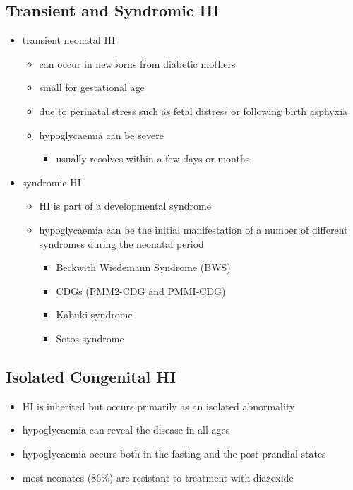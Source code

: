 \documentclass{scrartcl}
\begin{document}
\subsection{Transient and Syndromic HI}
\label{sec:org4ce6423}
\begin{itemize}
\item transient neonatal HI
\begin{itemize}
\item can occur in newborns from diabetic mothers
\item small for gestational age
\item due to perinatal stress such as fetal distress or following birth asphyxia
\item hypoglycaemia can be severe
\begin{itemize}
\item usually resolves within a few days or months
\end{itemize}
\end{itemize}
\item syndromic HI
\begin{itemize}
\item HI is part of a developmental syndrome
\item hypoglycaemia can be the initial manifestation of a number of
different syndromes during the neonatal period
\begin{itemize}
\item Beckwith Wiedemann Syndrome (BWS)
\item CDGs (PMM2-CDG and PMMI-CDG)
\item Kabuki syndrome
\item Sotos syndrome
\end{itemize}
\end{itemize}
\end{itemize}

\subsection{Isolated Congenital HI}
\label{sec:org18daacf}
\begin{itemize}
\item HI is inherited but occurs primarily as an isolated abnormality
\item hypoglycaemia can reveal the disease in all ages
\item hypoglycaemia occurs both in the fasting and the post-prandial states
\item most neonates (86\%) are resistant to treatment with diazoxide
\end{itemize}
\end{document}
